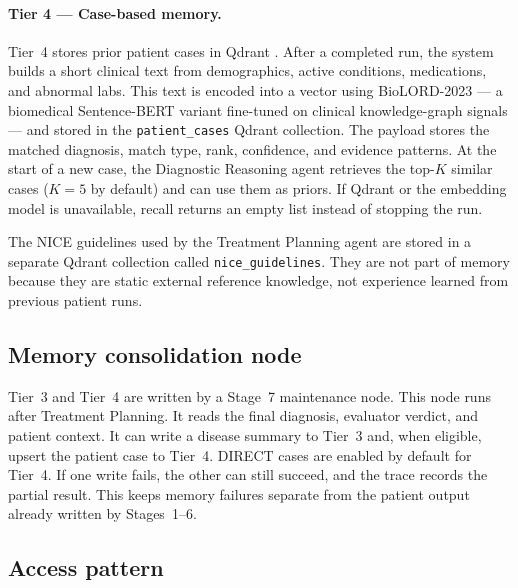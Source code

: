 \paragraph{Tier 4 --- Case-based memory.}
\label{sec:tier4}
Tier~4 stores prior patient cases in Qdrant \cite{Qdrant2024}. After a
completed run, the system
builds a short clinical text from demographics, active conditions, medications,
and abnormal labs. This text is encoded into a vector using
BioLORD-2023 \cite{Remy2023BioLORD} --- a biomedical Sentence-BERT
variant \cite{Reimers2019SentenceBERT} fine-tuned on clinical
knowledge-graph signals --- and stored in the
\texttt{patient\_cases} Qdrant collection.
The payload stores the matched diagnosis, match type, rank, confidence, and
evidence patterns. At the start of a new case, the Diagnostic Reasoning agent
retrieves the top-$K$ similar cases ($K=5$ by default) and can use them as
priors. If Qdrant or the embedding model is unavailable, recall returns an
empty list instead of stopping the run.

The NICE guidelines used by the Treatment Planning agent are stored in a
separate Qdrant collection called \texttt{nice\_guidelines}. They are not part
of memory because they are static external reference knowledge, not experience
learned from previous patient runs.

\subsection{Memory consolidation node}
\label{sec:consolidation}

Tier~3 and Tier~4 are written by a Stage~7 maintenance node. This node runs
after Treatment Planning. It reads the final diagnosis, evaluator verdict, and
patient context. It can write a disease summary to Tier~3 and, when eligible,
upsert the patient case to Tier~4. DIRECT cases are enabled by default for
Tier~4. If one write fails, the other can still succeed, and the trace records
the partial result. This keeps memory failures separate from the patient output
already written by Stages~1--6.

\subsection{Access pattern}
\label{sec:memory_access}

